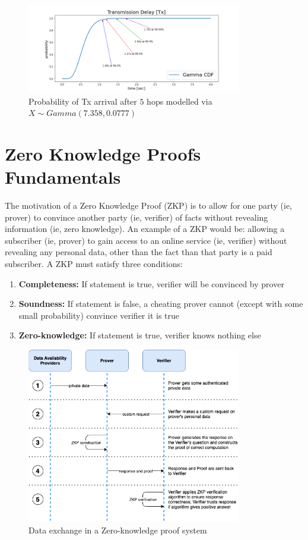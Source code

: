 \documentclass[peerreview]{ieeesyscoin}
\begin{document}
\begin{figure}[h!]
\includegraphics[width=3.7in]{img/transmission_delay.png}
\caption{Probability of Tx arrival after $5$ hops modelled via $X \sim Gamma(7.358,0.0777)$} 
\label{fig:tx_delay}
\end{figure} 

\section{Zero Knowledge Proofs Fundamentals}

The motivation of a Zero Knowledge Proof (ZKP) is to allow for one party (ie, prover) to convince another party (ie, verifier) of facts without revealing information (ie, zero knowledge). An example of a ZKP would be: allowing a subscriber (ie, prover) to gain access to an online service (ie, verifier) without revealing any personal data, other than the fact than that party is a paid subscriber. A ZKP must satisfy three conditions:

\begin{enumerate}
\item \textbf{Completeness:} If statement is true, verifier will be convinced by prover
\item\textbf{Soundness:} If statement is false, a cheating prover cannot (except with some small probability) convince verifier it is true
\item \textbf{Zero-knowledge:} If statement is true, verifier knows nothing else
\end{enumerate}

\begin{figure}[h!]
\includegraphics[width=3.7in]{img/zkp.png}
\caption{Data exchange in a Zero-knowledge proof system} 
\label{fig:zkp}
\end{figure} 
\end{document}
